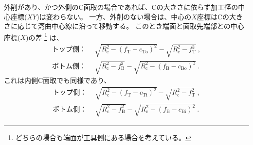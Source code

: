 \clearpage
外削があり、かつ外側のC面取の場合であれば、Cの大きさに依らず加工径の中心座標($XY$)は変わらない。
一方、外削のない場合は、中心の$X$座標はCの大きさに応じて湾曲中心線に沿って移動する。
このとき端面と面取先端部との中心座標($X$)の差
\footnote{どちらの場合も端面が工具側にある場合を考えている。}
は、
\begin{align*}
  \text{トップ側：}&~~
  \sqrt{R_\mathrm c^2-\left(f_\mathrm T-c_\mathrm{To}\right)^2}-\sqrt{R_\mathrm c^2-f_\mathrm T^2}\ ,\\
  \text{ボトム側：}&~~
  \sqrt{R_\mathrm c^2-f_\mathrm B^2}-\sqrt{R_\mathrm c^2-\left(f_\mathrm B-c_\mathrm{Bo}\right)^2}\ .
\end{align*}
これは内側C面取でも同様であり、
\begin{align*}
  \text{トップ側：}&~~
  \sqrt{R_\mathrm c^2-\left(f_\mathrm T-c_\mathrm{Ti}\right)^2}-\sqrt{R_\mathrm c^2-f_\mathrm T^2}\ ,\\
  \text{ボトム側：}&~~
  \sqrt{R_\mathrm c^2-f_\mathrm B^2}-\sqrt{R_\mathrm c^2-\left(f_\mathrm B-c_\mathrm{Bi}\right)^2}\ .
\end{align*}



